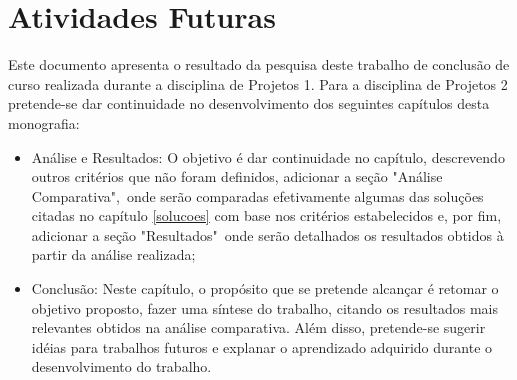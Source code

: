\chapter{Atividades Futuras}
Este documento apresenta o resultado da pesquisa deste trabalho de conclusão de curso realizada durante a disciplina de Projetos 1. Para a disciplina de Projetos 2 pretende-se dar continuidade no desenvolvimento dos seguintes capítulos desta monografia:

\begin{itemize}
    \item Análise e Resultados: O objetivo é dar continuidade no capítulo, descrevendo outros critérios que não foram definidos, adicionar a seção "Análise Comparativa",\ onde serão comparadas efetivamente algumas das soluções citadas no capítulo \ref{solucoes} com base nos critérios estabelecidos e, por fim, adicionar a seção "Resultados"\ onde serão detalhados os resultados obtidos à partir da análise realizada;
    \item Conclusão: Neste capítulo, o propósito que se pretende alcançar é retomar o objetivo proposto, fazer uma síntese do trabalho, citando os resultados mais relevantes obtidos na análise comparativa. Além disso, pretende-se sugerir idéias para trabalhos futuros e explanar o aprendizado adquirido durante o desenvolvimento do trabalho.
\end{itemize}
